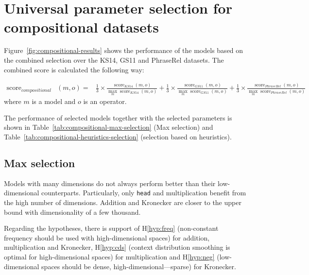 \section{Universal parameter selection for compositional datasets}
\label{sec:robust-param-comp-selecion}

Figure~\ref{fig:compositional-results} shows the performance of the models based on the combined selection over the KS14, GS11 and PhraseRel datasets. The combined score is calculated the following way:

{
\scriptsize
\begin{align*}
\operatorname{score}_\mathit{compositional}&(\mathit{m}, \mathit{o}) =
&\frac{1}{3}\times%
\frac{\operatorname{score}_\mathit{KS14}(\mathit{m}, \mathit{o})}%
{\max_m\operatorname{score}_\mathit{KS14}(m, \mathit{o})}%
+%
\frac{1}{3}\times%
\frac{\operatorname{score}_\mathit{GS11}(\mathit{m}, \mathit{o})}%
{\max_m\operatorname{score}_\mathit{GS11}(m, \mathit{o})}%
+%
\frac{1}{3}\times%
\frac{\operatorname{score}_\mathit{PhraseRel}(\mathit{m, \mathit{o}})}%
{\max_m\operatorname{score}_\mathit{PhraseRel}(m, \mathit{o})}%
\end{align*}
}
where $m$ is a model and $o$ is an operator.

The performance of selected models together with the selected parameters is shown in Table~\ref{tab:compositional-max-selection} (Max selection) and Table~\ref{tab:compositional-heuristics-selection} (selection based on heuristics).



\subsection{Max selection}
\label{sec:max-selection-compositional}

Models with many dimensions do not always perform better than their low-dimensional counterparts. Particularly, only \texttt{head} and multiplication benefit from the high number of dimensions. Addition and Kronecker are closer to the upper bound with dimensionality of a few thousand.

Regarding the hypotheses, there is support of H\ref{hyp:freq} (non-constant frequency should be used with high-dimensional spaces) for addition, multiplication and Kronecker, H\ref{hyp:cds} (context distribution smoothing is optimal for high-dimensional spaces) for multiplication and H\ref{hyp:neg} (low-dimensional spaces should be dense, high-dimensional---sparse) for Kronecker.

